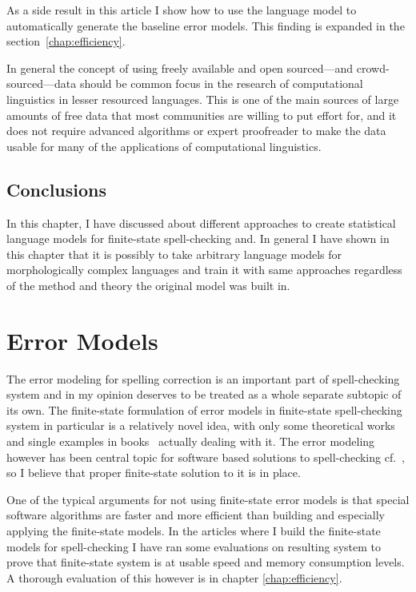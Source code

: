 \documentclass[officiallayout,draft]{unihelcompling}
\begin{document}
As a side result in this article I show how to use the language model to
automatically generate the baseline error models. This finding is expanded in
the section~\ref{chap:efficiency}.

In general the concept of using freely available and open sourced---and
crowd-sourced---data should be common focus in the research of computational
linguistics in lesser resourced languages. This is one of the main sources of
large amounts of free data that most communities are willing to put effort for,
and it does not require advanced algorithms or expert proofreader to make the
data usable for many of the applications of computational linguistics.

\section{Conclusions}

In this chapter, I have discussed about different approaches to create
statistical language models for finite-state spell-checking and.  In general I
have shown in this chapter that it is possibly to take arbitrary language
models for morphologically complex languages and train it with same approaches
regardless of the method and theory the original model was built in.


\chapter{Error Models}
\label{chap:error-models}

The error modeling for spelling correction is an important part of
spell-checking system and in my opinion deserves to be treated as a whole
separate subtopic of its own. The finite-state formulation of error models in
finite-state spell-checking system in particular is a relatively novel idea,
with only some theoretical works \citep{agata2002typographical,mohri2003edit}
and single examples in books~\citep{beesley2003finite} actually dealing with
it.  The error modeling however has been central topic for software based
solutions to spell-checking
cf.~\citet{deorowicz2005correcting,kukich1992spelling,mitton2009orderingdeorowicz2005correcting},
so I believe that proper finite-state solution to it is in place.

One of the typical arguments for not using finite-state error models is that
special software algorithms are faster and more efficient than building and
especially applying the finite-state models. In the articles where I build
the finite-state models for spell-checking I have ran some evaluations on
resulting system to prove that finite-state system is at usable speed
and memory consumption levels. A thorough evaluation of this however
is in chapter \ref{chap:efficiency}.
\end{document}
